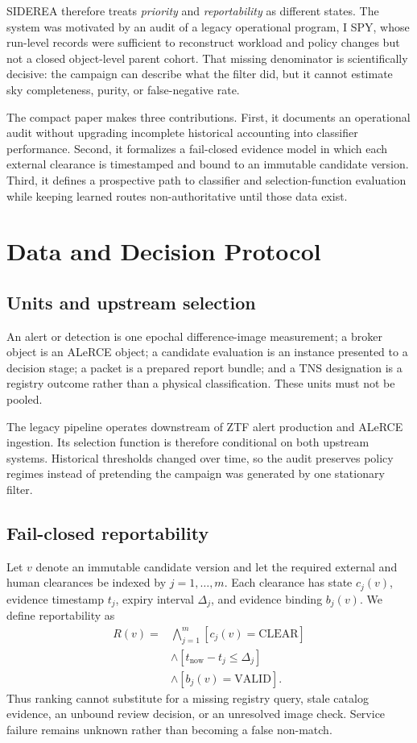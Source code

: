 \documentclass[10pt,conference]{IEEEtran}
\begin{document}
SIDEREA therefore treats \emph{priority} and \emph{reportability} as different states. The system was motivated by an audit of a legacy operational program, I SPY, whose run-level records were sufficient to reconstruct workload and policy changes but not a closed object-level parent cohort. That missing denominator is scientifically decisive: the campaign can describe what the filter did, but it cannot estimate sky completeness, purity, or false-negative rate.

The compact paper makes three contributions. First, it documents an operational audit without upgrading incomplete historical accounting into classifier performance. Second, it formalizes a fail-closed evidence model in which each external clearance is timestamped and bound to an immutable candidate version. Third, it defines a prospective path to classifier and selection-function evaluation while keeping learned routes non-authoritative until those data exist.

\section{Data and Decision Protocol}
\subsection{Units and upstream selection}
An alert or detection is one epochal difference-image measurement; a broker object is an ALeRCE object; a candidate evaluation is an instance presented to a decision stage; a packet is a prepared report bundle; and a TNS designation is a registry outcome rather than a physical classification. These units must not be pooled.

The legacy pipeline operates downstream of ZTF alert production and ALeRCE ingestion. Its selection function is therefore conditional on both upstream systems. Historical thresholds changed over time, so the audit preserves policy regimes instead of pretending the campaign was generated by one stationary filter.

\subsection{Fail-closed reportability}
Let $v$ denote an immutable candidate version and let the required external and human clearances be indexed by $j=1,\ldots,m$. Each clearance has state $c_j(v)$, evidence timestamp $t_j$, expiry interval $\Delta_j$, and evidence binding $b_j(v)$. We define reportability as
\begin{equation}
\begin{split}
R(v)={}&\bigwedge_{j=1}^{m}\left[c_j(v)=\mathrm{CLEAR}\right] \\
&\land\left[t_{\mathrm{now}}-t_j\le \Delta_j\right] \\
&\land\left[b_j(v)=\mathrm{VALID}\right].
\end{split}
\end{equation}
Thus ranking cannot substitute for a missing registry query, stale catalog evidence, an unbound review decision, or an unresolved image check. Service failure remains unknown rather than becoming a false non-match.
\end{document}
